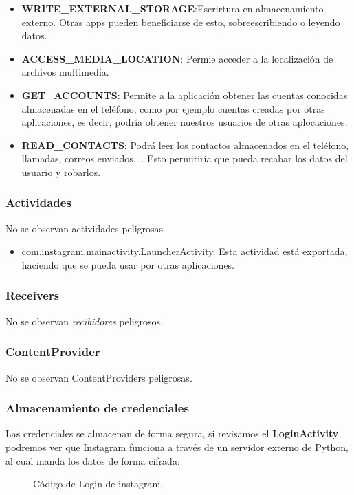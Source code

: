 \documentclass[12pt,twoside]{article}
\begin{document}
\begin{itemize}
    \item \textbf{WRITE\_EXTERNAL\_STORAGE}:Escrirtura en almacenamiento externo. Otras apps pueden beneficiarse de esto, sobreescribiendo o leyendo datos.
    \item \textbf{ACCESS\_MEDIA\_LOCATION}: Permie acceder a la localización de archivos multimedia. 
    \item \textbf{GET\_ACCOUNTS}: Permite a la aplicación obtener las cuentas conocidas almacenadas en el teléfono, como por ejemplo cuentas creadas por otras aplicaciones, es decir, podría obtener nuestros usuarios de otras aplocaciones.
    \item \textbf{READ\_CONTACTS}: Podrá leer los contactos almacenados en el teléfono, llamadas, correos enviados.... Esto permitiría que pueda recabar los datos del usuario y robarlos.
\end{itemize}
\subsubsection{Actividades}
No se observan actividades peligrosas.
\begin{itemize}
    \item com.instagram.mainactivity.LauncherActivity. Esta actividad está exportada, haciendo que se pueda usar por otras aplicaciones.
\end{itemize}
\subsubsection{Receivers}
No se observan \textit{recibidores} peligrosos.
\subsubsection{ContentProvider}
No se observan ContentProviders peligrosas.
\subsubsection{Almacenamiento de credenciales}
Las credenciales se almacenan de forma segura, si revisamos el \textbf{LoginActivity}, podremos ver que Instagram funciona a través de un servidor externo de Python, al cual manda los datos de forma cifrada:
\begin{figure}[H]
    \centering
    \caption{Código de Login de instagram.}
\end{figure}
\end{document}
